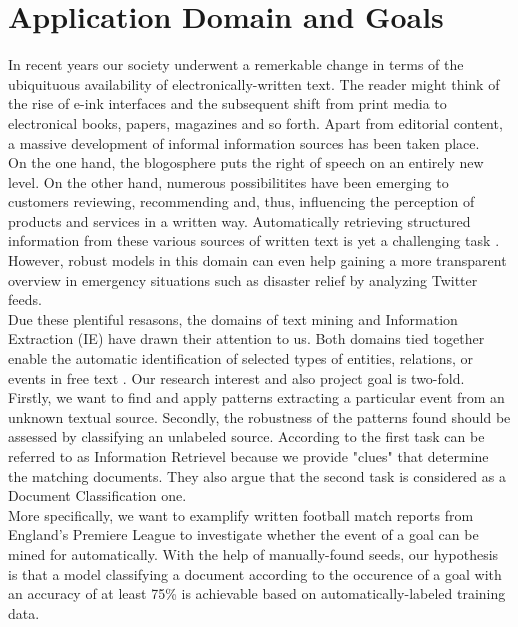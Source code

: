 \documentclass[11pt,titlepage,oneside,openany]{book}
\begin{document}
\section{Application Domain and Goals}
\label{sec:goals}
In recent years our society underwent a remerkable change in terms of the ubiquituous availability of electronically-written text. The reader might think of the rise of e-ink interfaces and the subsequent shift from print media to electronical books, papers, magazines and so forth. Apart from editorial content, a massive development of informal information sources has been taken place.\\ 
On the one hand, the blogosphere puts the right of speech on an entirely new level. On the other hand, numerous possibilitites have been emerging to customers reviewing, recommending and, thus, influencing the perception of products and services in a written way. Automatically retrieving structured information from these various sources of written text is yet a challenging task \citep[p.1]{Cellier2010}. However, robust models in this domain can even help gaining a more transparent overview in emergency situations such as disaster relief by analyzing Twitter feeds.\\

Due these plentiful resasons, the domains of text mining and Information Extraction (IE) have drawn their attention to us. Both domains tied together enable the automatic identification of selected types of entities, relations, or events in free text \citep[p.545]{Grishman2005}. Our research interest and also project goal is two-fold. Firstly, we want to find and apply patterns extracting a particular event from an unknown textual source. Secondly, the robustness of the patterns found should be assessed by classifying an unlabeled source. According to \citeauthor*{Weiss2005} \citeyearpar{Weiss2005} the first task can be referred to as Information Retrievel because we provide "clues" that determine the matching documents. They also argue that the second task is considered as a Document Classification one.\\

More specifically, we want to examplify written football match reports from England's Premiere League to investigate whether the event of a goal can be mined for automatically. With the help of manually-found seeds, our hypothesis is that a model classifying a document according to the occurence of a goal with an accuracy of at least 75\% is achievable based on automatically-labeled training data.\\
\end{document}
